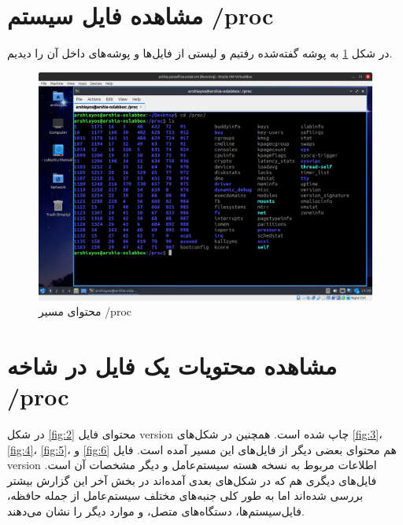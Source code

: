 \documentclass[12pt]{article}
\begin{document}
	\section{مشاهده فایل سیستم \textenglish{/proc}}
	در شکل \ref{fig:1} به پوشه گفته‌شده رفتیم و لیستی از فایل‌ها و پوشه‌های داخل آن را دیدیم.
	\begin{figure}[H]
		\centering
		\includegraphics[width=\textwidth]{report3-resources/1.png}
		\caption{محتوای مسیر \textenglish{/proc}}
		\label{fig:1}
	\end{figure}
	
	\newpage
	\section{مشاهده محتویات یک فایل در شاخه \textenglish{/proc}}
	در شکل \ref{fig:2} محتوای فایل version چاپ شده است. همچنین در شکل‌های \ref{fig:3}، 
	\ref{fig:4}،
	\ref{fig:5}، و
	\ref{fig:6}
	هم محتوای بعضی دیگر از فایل‌های این مسیر آمده است. فایل version اطلاعات مربوط به نسخه هسته سیستم‌عامل و دیگر مشخصات آن است. فایل‌های دیگری هم که در شکل‌های بعدی آمده‌اند در بخش آخر این گزارش بیشتر بررسی شده‌اند اما به طور کلی جنبه‌های مختلف سیستم‌عامل از جمله حافظه، فایل‌سیستم‌ها، دستگاه‌های متصل، و موارد دیگر را نشان می‌دهند.
	
\end{document}
